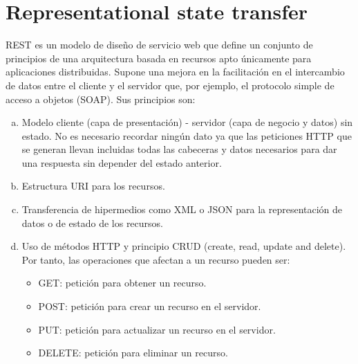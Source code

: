 \documentclass[a4paper, 12pt]{book}
\begin{document}
\section{Representational state transfer}
REST es un modelo de diseño de servicio web que define un conjunto de principios de una arquitectura basada en recursos apto únicamente para aplicaciones distribuidas. Supone una mejora en la facilitación en el intercambio  de  datos  entre  el  cliente  y  el  servidor  que, por ejemplo, el protocolo simple de acceso a objetos (SOAP).  Sus principios son:
\begin{enumerate}[a)] %
\item Modelo cliente (capa de presentación) - servidor (capa de negocio y datos) sin estado. No es necesario recordar ningún dato ya que las peticiones HTTP que se generan llevan incluidas todas las cabeceras y datos necesarios para dar una respuesta sin depender del estado anterior.
\item Estructura URI para los recursos.
\item Transferencia de hipermedios como XML o JSON para la representación de datos o de estado de los recursos.
\item Uso de métodos HTTP y principio CRUD (create, read, update and delete). Por tanto, las operaciones que afectan a un recurso pueden ser:
\begin{itemize}
    \item GET: petición para obtener un recurso.
    \item POST: petición para crear un recurso en el servidor.
    \item PUT: petición para actualizar un recurso en el servidor.
    \item DELETE: petición para eliminar un recurso.~\cite{rodriguez2008restful}
\end{itemize}
\end{enumerate}
\end{document}
